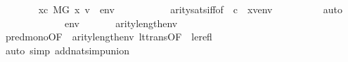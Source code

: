 \begin{isabellebody}
\ \ \ \ \ \ \isamarkupfalse%
\ {\isachardoublequoteopen}{\isasymexists}x{\isasymin}c{\isachardot}{\kern0pt}\ M{\isacharbrackleft}{\kern0pt}G{\isacharbrackright}{\kern0pt}{\isacharcomma}{\kern0pt}\ {\isacharbrackleft}{\kern0pt}x{\isacharcomma}{\kern0pt}\ v{\isacharbrackright}{\kern0pt}\ {\isacharat}{\kern0pt}\ env{\isasymTurnstile}\ {\isasymphi}{\isachardoublequoteclose}\isanewline
\ \ \ \ \ \ \ \ \isamarkupfalse%
\ arity{\isacharunderscore}{\kern0pt}sats{\isacharunderscore}{\kern0pt}iff{\isacharbrackleft}{\kern0pt}of\ {\isasymphi}\ {\isachardoublequoteopen}{\isacharbrackleft}{\kern0pt}c{\isacharbrackright}{\kern0pt}{\isachardoublequoteclose}\ {\isacharunderscore}{\kern0pt}\ {\isachardoublequoteopen}{\isacharbrackleft}{\kern0pt}x{\isacharcomma}{\kern0pt}v{\isacharbrackright}{\kern0pt}{\isacharat}{\kern0pt}env{\isachardoublequoteclose}{\isacharbrackright}{\kern0pt}\isanewline
\ \ \ \ \ \ \ \ \isamarkupfalse%
\ auto\isanewline
\ \ \ \ \isamarkupfalse%
\isanewline
\ \ \isamarkupfalse%
\isanewline
\ \ \ \ \isamarkupfalse%
\ {\isacartoucheopen}env{\isasymin}{\isacharunderscore}{\kern0pt}{\isacartoucheclose}\ {\isacartoucheopen}{\isasymphi}{\isasymin}{\isacharunderscore}{\kern0pt}{\isacartoucheclose}\isanewline
\ \ \ \ \isamarkupfalse%
\ {\isachardoublequoteopen}arity{\isacharparenleft}{\kern0pt}{\isacharquery}{\kern0pt}{\isasympsi}{\isacharparenright}{\kern0pt}{\isasymle}{}{\isacharhash}{\kern0pt}{\isacharplus}{\kern0pt}length{\isacharparenleft}{\kern0pt}env{\isacharparenright}{\kern0pt}{\isachardoublequoteclose}\isanewline
\ \ \ \ \ \ \isamarkupfalse%
\ pred{\isacharunderscore}{\kern0pt}mono{\isacharbrackleft}{\kern0pt}OF\ {\isacharunderscore}{\kern0pt}\ {\isacartoucheopen}arity{\isacharparenleft}{\kern0pt}{\isasymphi}{\isacharparenright}{\kern0pt}{\isasymle}{}{\isacharhash}{\kern0pt}{\isacharplus}{\kern0pt}length{\isacharparenleft}{\kern0pt}env{\isacharparenright}{\kern0pt}{\isacartoucheclose}{\isacharbrackright}{\kern0pt}\ lt{\isacharunderscore}{\kern0pt}trans{\isacharbrackleft}{\kern0pt}OF\ {\isacharunderscore}{\kern0pt}\ le{\isacharunderscore}{\kern0pt}refl{\isacharbrackright}{\kern0pt}\isanewline
\ \ \ \ \ \ \isamarkupfalse%
\ {\isacharparenleft}{\kern0pt}auto\ simp\ add{\isacharcolon}{\kern0pt}nat{\isacharunderscore}{\kern0pt}simp{\isacharunderscore}{\kern0pt}union{\isacharparenright}{\kern0pt}\isanewline
\ \ \isamarkupfalse%
\isanewline
\ \ \ \ \isamarkupfalse%

\end{isabellebody}

